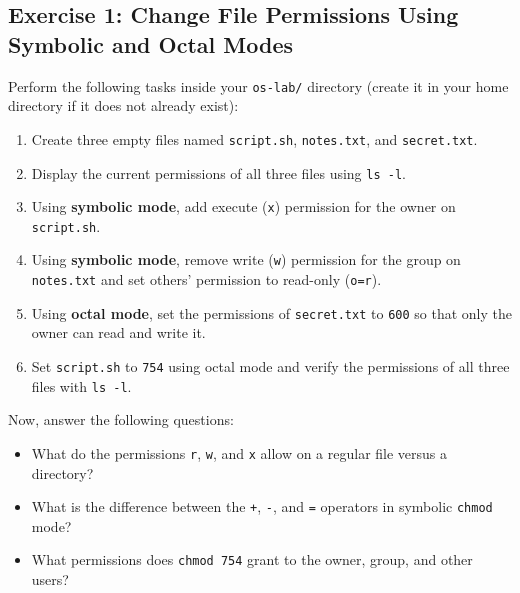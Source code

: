 \subsection{Exercise 1: Change File Permissions Using Symbolic and Octal Modes}
Perform the following tasks inside your \texttt{os-lab/} directory (create it in your home directory if it does not already exist):
\begin{enumerate}
	\item Create three empty files named \texttt{script.sh}, \texttt{notes.txt}, and \texttt{secret.txt}.
	\item Display the current permissions of all three files using \texttt{ls -l}.
	\item Using \textbf{symbolic mode}, add execute (\texttt{x}) permission for the owner on \texttt{script.sh}.
	\item Using \textbf{symbolic mode}, remove write (\texttt{w}) permission for the group on \texttt{notes.txt} and set others' permission to read-only (\texttt{o=r}).
	\item Using \textbf{octal mode}, set the permissions of \texttt{secret.txt} to \texttt{600} so that only the owner can read and write it.
	\item Set \texttt{script.sh} to \texttt{754} using octal mode and verify the permissions of all three files with \texttt{ls -l}.
\end{enumerate}

Now, answer the following questions:
\begin{itemize}
	\item What do the permissions \texttt{r}, \texttt{w}, and \texttt{x} allow on a regular file versus a directory?
	\item What is the difference between the \texttt{+}, \texttt{-}, and \texttt{=} operators in symbolic \texttt{chmod} mode?
	\item What permissions does \texttt{chmod 754} grant to the owner, group, and other users?
\end{itemize}

